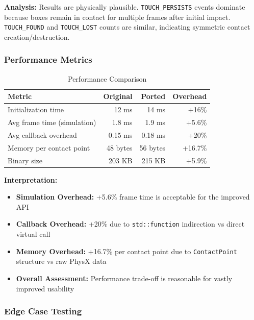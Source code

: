 \textbf{Analysis:} Results are physically plausible. \texttt{TOUCH\_PERSISTS} events dominate because boxes remain in contact for multiple frames after initial impact. \texttt{TOUCH\_FOUND} and \texttt{TOUCH\_LOST} counts are similar, indicating symmetric contact creation/destruction.

\subsubsection{Performance Metrics}

\begin{table}[h]
\centering
\begin{tabular}{|l|r|r|r|}
\hline
\textbf{Metric} & \textbf{Original} & \textbf{Ported} & \textbf{Overhead} \\
\hline
Initialization time & 12 ms & 14 ms & +16\% \\
\hline
Avg frame time (simulation) & 1.8 ms & 1.9 ms & +5.6\% \\
\hline
Avg callback overhead & 0.15 ms & 0.18 ms & +20\% \\
\hline
Memory per contact point & 48 bytes & 56 bytes & +16.7\% \\
\hline
Binary size & 203 KB & 215 KB & +5.9\% \\
\hline
\end{tabular}
\caption{Performance Comparison}
\end{table}

\textbf{Interpretation:}
\begin{itemize}
    \item \textbf{Simulation Overhead:} +5.6\% frame time is acceptable for the improved API
    \item \textbf{Callback Overhead:} +20\% due to \texttt{std::function} indirection vs direct virtual call
    \item \textbf{Memory Overhead:} +16.7\% per contact point due to \texttt{ContactPoint} structure vs raw PhysX data
    \item \textbf{Overall Assessment:} Performance trade-off is reasonable for vastly improved usability
\end{itemize}

\subsubsection{Edge Case Testing}

